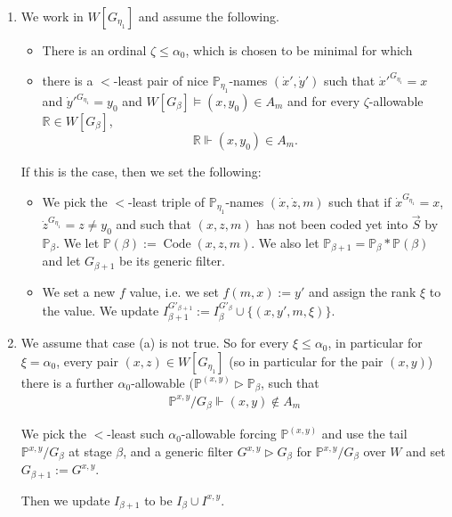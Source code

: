 \documentclass[a4paper,11pt]{article}
\newcommand{\forceP}{\mathbb{P}}
\newcommand{\forceR}{\mathbb{R}}
\begin{document}
\begin{enumerate}
\item[(1)] We work in $W[G_{\eta_1}]$ and assume the following.
\begin{itemize}
\item There is an ordinal $\zeta \le \alpha_0$, which is chosen to be minimal for which
\item there is a $<$-least pair of nice $\forceP_{\eta_1}$-names $(\dot{x}',\dot{y}')$ such that $\dot{x}'^{G_{\eta_1}}=x$ and $\dot{y}'^{G_{\eta_1}}=y_0$ and $W[G_{\beta}] \models (x,y_0) \in A_m$ and
for every $\zeta$-allowable $\forceR \in W[G_{\beta}]$, 
\[ \forceR \Vdash (x,y_0) \in A_m. \]

\end{itemize}
If this is the case, then we set the following:
\begin{itemize}
\item We pick the $<$-least triple of $\forceP_{\eta_1}$-names $(\dot{x}, \dot{z}, m)$ such that if $\dot{x}^{G_{\eta_1}} =x$, $\dot{z}^{G_{\eta_1}} =z \ne y_0$ and such that $(x,z,m)$ has not been coded yet into $\vec{S}$ by $\forceP_{\beta}$. We let $\forceP(\beta):=\operatorname{Code} {(x,z,m)}$.  We also let $\forceP_{\beta+1} = \forceP_{\beta} \ast \forceP(\beta)$ and let $G_{\beta+1}$ be its generic filter.

\item  We set a new $f$ value, i.e. we set $f(m,x):=y'$ and assign the rank $\xi$ to the value. We update $I_{\beta+1}^{G'_{\beta+1}}:= I_{\beta}^{G'_{\beta}} \cup \{ (x,y',m,\xi)\}$.

\end{itemize}

\item [(2)]
We assume that case (a) is not true. 
So for every $\xi \le \alpha_0$, in particular for $\xi=\alpha_0$, every pair $(x,z) \in W[G_{\eta_1}]$ (so in particular for the pair $(x,y)$) 
there is a further $\alpha_0$-allowable $(\forceP^{(x,y)} \triangleright \forceP_{\beta}$, such that 
\begin{align*}
\forceP^{x,y} \slash G_{\beta} \Vdash (x,y) \notin A_m
\end{align*}

We pick the $<$-least such $\alpha_0$-allowable forcing $\forceP^{(x,y)}$ and use the tail $\forceP^{x,y} \slash G_{\beta}$ at stage $\beta$, and a generic filter $G^{x,y} \triangleright G_{\beta}$ for $\forceP^{x,y} \slash G_{\beta}$ over $W$ and set $G_{\beta+1}:= G^{x,y}$.

Then we update $I_{\beta+1}$ to be $I_{\beta} \cup I^{x,y}$. 


\end{enumerate}
\end{document}
